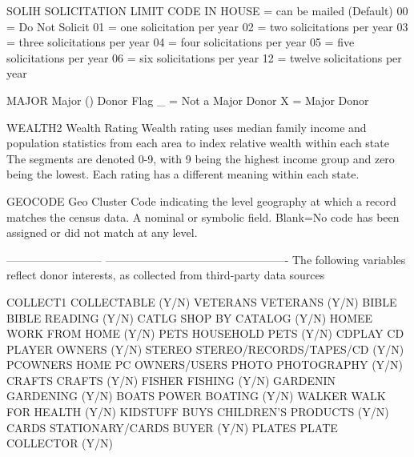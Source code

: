 \documentclass[
  11pt,
  a4paper,
  DIV=12,captions=tableheading,oneside,titlepage]{scrbook}
\let\oldverbatim\verbatim
\let\endoldverbatim\endverbatim
\renewenvironment{verbatim}{\footnotesize\oldverbatim}{\endoldverbatim}
\begin{document}
\begin{verbatim}
SOLIH                       SOLICITATION LIMIT CODE IN HOUSE
                               = can be mailed (Default)
                            00 = Do Not Solicit
                            01 = one solicitation per year
                            02 = two solicitations per year
                            03 = three solicitations per year
                            04 = four solicitations per year
                            05 = five solicitations per year
                            06 = six solicitations per year
                            12 = twelve solicitations per year
                           
MAJOR                       Major ($$) Donor Flag
                            _ = Not a Major Donor
                            X = Major Donor
                           
WEALTH2                     Wealth Rating
                            Wealth rating uses median family income and
                            population statistics from each area to
                            index relative wealth within each state
                            The segments are denoted 0-9, with 9 being
                            the highest income group and zero being the
                            lowest. Each rating has a different meaning
                            within each state.
                           
GEOCODE                     Geo Cluster Code indicating the level geography at which 
                            a record matches the census data.  
                            A nominal or symbolic field.
                            Blank=No code has been assigned or did not 
                            match at any level.
                           
--------------------------  -------------------------------------------------
                            The following variables reflect donor interests, 
                            as collected from third-party data sources
                           
COLLECT1                    COLLECTABLE (Y/N)
VETERANS                    VETERANS (Y/N)
BIBLE                       BIBLE READING (Y/N)
CATLG                       SHOP BY CATALOG (Y/N)
HOMEE                       WORK FROM HOME (Y/N)
PETS                        HOUSEHOLD PETS (Y/N)
CDPLAY                      CD PLAYER OWNERS (Y/N)
STEREO                      STEREO/RECORDS/TAPES/CD (Y/N)
PCOWNERS                    HOME PC OWNERS/USERS
PHOTO                       PHOTOGRAPHY (Y/N)
CRAFTS                      CRAFTS (Y/N)
FISHER                      FISHING (Y/N)
GARDENIN                    GARDENING (Y/N)
BOATS                       POWER BOATING (Y/N)
WALKER                      WALK FOR HEALTH (Y/N)
KIDSTUFF                    BUYS CHILDREN'S PRODUCTS (Y/N)
CARDS                       STATIONARY/CARDS BUYER (Y/N)
PLATES                      PLATE COLLECTOR (Y/N)
                           

\end{verbatim}
\end{document}
